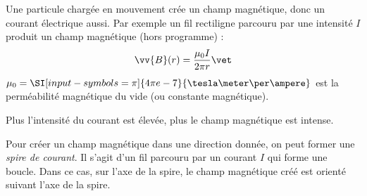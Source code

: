 \documentclass{cours}
\begin{document}
Une particule chargée en mouvement crée un champ magnétique, donc un courant électrique aussi. Par exemple un fil rectiligne parcouru par une intensité $I$ produit un champ magnétique (hors programme) :
\begin{equation}
  \vv{B}(r) = \frac{\mu_0I}{2\pi r}\vet
\end{equation}
$\mu_0 = \SI[input-symbols=\pi]{4\pi e-7}{\tesla\meter\per\ampere}$ est la perméabilité magnétique du vide (ou constante magnétique). 
\begin{center}
\end{center}
Plus l'intensité du courant est élevée, plus le champ magnétique est intense. 

Pour créer un champ magnétique dans une direction donnée, on peut former une \emph{spire de courant}. Il s'agit d'un fil parcouru par un courant $I$ qui forme une boucle. Dans ce cas, sur l'axe de la spire, le champ magnétique créé est orienté suivant l'axe de la spire.
\end{document}
